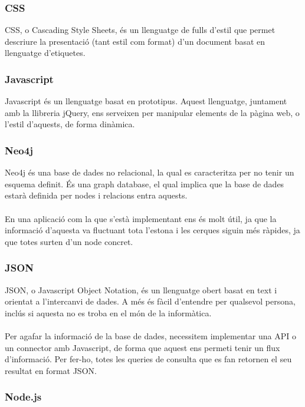 \documentclass[11pt,catalan,listoffigures,listoftables]{tfgetsinf}
\begin{document}
\subsubsection{CSS}

CSS, o Cascading Style Sheets, és un llenguatge de fulls d'estil que permet descriure la presentació (tant estil com format) d'un document basat en llenguatge d'etiquetes.

\subsubsection{Javascript}

Javascript és un llenguatge basat en prototipus. Aquest llenguatge, juntament amb la llibreria jQuery, ens serveixen per manipular elements de la pàgina web, o l'estil d'aquests, de forma dinàmica.

\subsubsection{Neo4j}

Neo4j és una base de dades no relacional, la qual es caracteritza per no tenir un esquema definit. És una graph database, el qual implica que la base de dades estarà definida per nodes i relacions entra aquests.\\ \\
En una aplicació com la que s'està implementant ens és molt útil, ja que la informació d'aquesta va fluctuant tota l'estona i les cerques siguin més ràpides, ja que totes surten d'un node concret.

\subsubsection{JSON}
JSON, o Javascript Object Notation, és un llenguatge obert basat en text i orientat a l'intercanvi de dades. A més és fàcil d'entendre per qualsevol persona, inclús si aquesta no es troba en el món de la informàtica.\\ \\
Per agafar la informació de la base de dades, necessitem implementar una API o un connector amb Javascript, de forma que aquest ens permeti tenir un flux d'informació. Per fer-ho, totes les queries de consulta que es fan retornen el seu resultat en format JSON.

\subsubsection{Node.js}
\end{document}
